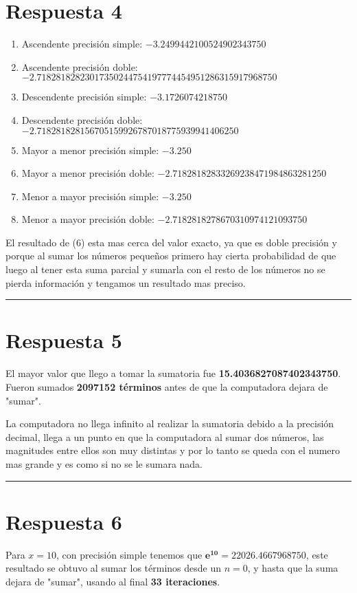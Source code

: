 \documentclass{article}
\begin{document}
\section*{Respuesta 4}
\begin{enumerate}
	\item Ascendente precisión simple: $-3.2499442100524902343750$
	\item Ascendente precisión doble: $-2.71828182823017350244754197774454951286315917968750$
	\item Descendente precisión simple: $-3.1726074218750$
	\item Descendente precisión doble: $-2.718281828156705159926787018775939941406250$
	\item Mayor a menor precisión simple: $-3.250$
	\item Mayor a menor precisión doble: $-2.71828182833269238471984863281250$
	\item Menor a mayor precisión simple: $-3.250$ 
	\item Menor a mayor precisión doble: $-2.7182818278670310974121093750$
\end{enumerate}
	El resultado de (6) esta mas cerca del valor exacto, ya que es doble precisión
	y porque al sumar los números pequeños primero hay cierta probabilidad de que
	luego al tener esta suma parcial y sumarla con el resto de los números no
	se pierda información y tengamos un resultado mas preciso.
	\vspace{0.3cm}


\hrule
\section*{Respuesta 5}
El mayor valor que llego a tomar la sumatoria fue \textbf{15.4036827087402343750}.
Fueron sumados \textbf{2097152 términos} antes de que la computadora dejara de "sumar".

La computadora no llega infinito al realizar la sumatoria debido
a la precisión decimal, llega a un punto en que la computadora al sumar dos números, las magnitudes entre ellos
son muy distintas y por lo tanto se queda con el numero mas grande y es como si no se le sumara nada.
\vspace{0.3cm}


\hrule
\section*{Respuesta 6}
Para $x = 10$, con precisión simple tenemos que $\boldsymbol{e^{10} = 22026.4667968750}$,
este resultado se obtuvo al sumar los términos desde un $n = 0$, y hasta que la suma dejara de "sumar",
usando al final \textbf{33 iteraciones}.
\end{document}
